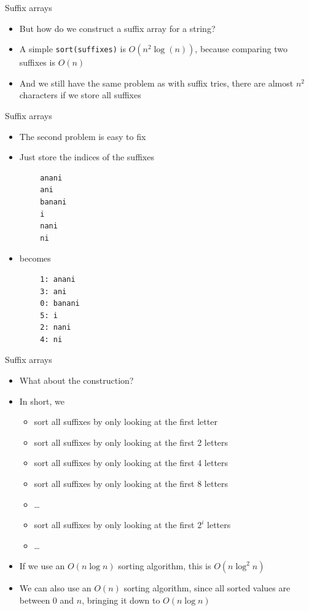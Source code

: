\documentclass{beamer}
\begin{document}
\begin{frame}{Suffix arrays}
	\begin{itemize}
		\item But how do we construct a suffix array for a string?
		\vspace{10pt}
		\item A simple \texttt{sort(suffixes)} is $O(n^2\log(n))$, because comparing two suffixes is $O(n)$
		\item And we still have the same problem as with suffix tries, there are almost $n^2$ characters if we store all suffixes
	\end{itemize}
\end{frame}

\begin{frame}[fragile]{Suffix arrays}
	\begin{itemize}
		\item The second problem is easy to fix
		\item Just store the indices of the suffixes
	\end{itemize}
	\begin{verbatim}
		anani
		ani
		banani
		i
		nani
		ni
	\end{verbatim}
	\begin{itemize}
		\item becomes
	\end{itemize}
	\begin{verbatim}
		1: anani
		3: ani
		0: banani
		5: i
		2: nani
		4: ni
	\end{verbatim}
\end{frame}

\begin{frame}{Suffix arrays}
	\begin{itemize}
		\item What about the construction?
		\item In short, we
		\begin{itemize}
			\item sort all suffixes by only looking at the first letter
			\item sort all suffixes by only looking at the first 2 letters
			\item sort all suffixes by only looking at the first 4 letters
			\item sort all suffixes by only looking at the first 8 letters
			\item \ldots
			\item sort all suffixes by only looking at the first $2^i$ letters
			\item \ldots
		\end{itemize}
		\vspace{10pt}
		\item If we use an $O(n\log n)$ sorting algorithm, this is $O(n\log^2 n)$
		\item We can also use an $O(n)$ sorting algorithm, since all sorted values are between $0$ and $n$, bringing it down to $O(n \log n)$
	\end{itemize}
\end{frame}
\end{document}
